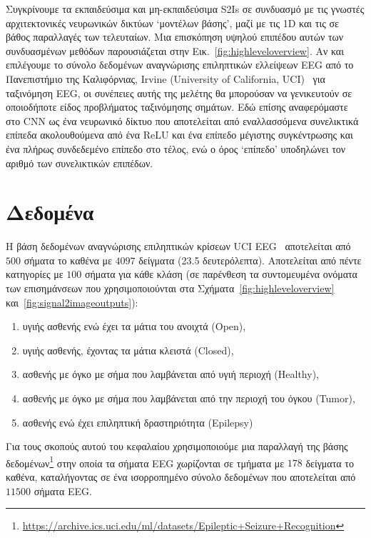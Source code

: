 Συγκρίνουμε τα εκπαιδεύσιμα και μη-εκπαιδεύσιμα S2Is σε συνδυασμό με τις γνωστές αρχιτεκτονικές νευρωνικών δικτύων `μοντέλων βάσης', μαζί με τις 1D και τις σε βάθος παραλλαγές των τελευταίων.
Μια επισκόπηση υψηλού επιπέδου αυτών των συνδυασμένων μεθόδων παρουσιάζεται στην Εικ.~\ref{fig:highleveloverview}.
Αν και επιλέγουμε το σύνολο δεδομένων αναγνώρισης επιληπτικών ελλείψεων EEG από το Πανεπιστήμιο της Καλιφόρνιας, Irvine (University of California, UCI)~\cite{andrzejak2001indications} για ταξινόμηση EEG, οι συνέπειες αυτής της μελέτης θα μπορούσαν να γενικευτούν σε οποιοδήποτε είδος προβλήματος ταξινόμησης σημάτων.
Εδώ επίσης αναφερόμαστε στο CNN ως ένα νευρωνικό δίκτυο που αποτελείται από εναλλασσόμενα συνελικτικά επίπεδα ακολουθούμενα από ένα ReLU και ένα επίπεδο μέγιστης συγκέντρωσης και ένα πλήρως συνδεδεμένο επίπεδο στο τέλος, ενώ ο όρος `επίπεδο' υποδηλώνει τον αριθμό των συνελικτικών επιπέδων.

\section{Δεδομένα}
Η βάση δεδομένων αναγνώρισης επιληπτικών κρίσεων UCI EEG~\cite{andrzejak2001indications} αποτελείται από $500$ σήματα το καθένα με $4097$ δείγματα (23.5 δευτερόλεπτα).
Αποτελείται από πέντε κατηγορίες με $100$ σήματα για κάθε κλάση (σε παρένθεση τα συντομευμένα ονόματα των επισημάνσεων που χρησιμοποιούνται στα Σχήματα~\ref{fig:highleveloverview} και~\ref{fig:signal2imageoutputs}):
\begin{enumerate}
	\item υγιής ασθενής ενώ έχει τα μάτια του ανοιχτά (Open),
	\item υγιής ασθενής, έχοντας τα μάτια κλειστά (Closed),
	\item ασθενής με όγκο με σήμα που λαμβάνεται από υγιή περιοχή (Healthy),
	\item ασθενής με όγκο με σήμα που λαμβάνεται από την περιοχή του όγκου (Tumor),
	\item ασθενής ενώ έχει επιληπτική δραστηριότητα (Epilepsy)
\end{enumerate}

Για τους σκοπούς αυτού του κεφαλαίου χρησιμοποιούμε μια παραλλαγή της βάσης δεδομένων\footnote{\url{https://archive.ics.uci.edu/ml/datasets/Epileptic+Seizure+Recognition}} στην οποία τα σήματα EEG χωρίζονται σε τμήματα με $178$ δείγματα το καθένα, καταλήγοντας σε ένα ισορροπημένο σύνολο δεδομένων που αποτελείται από $11500$ σήματα EEG\@.


